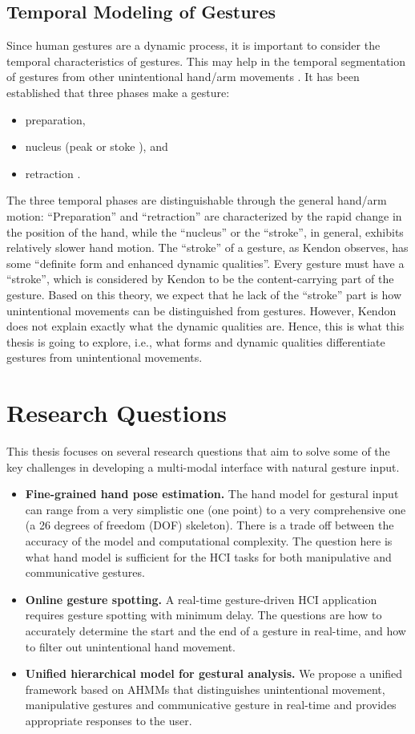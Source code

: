 \subsection{Temporal Modeling of Gestures}
Since human gestures are a dynamic process, it is important to consider the
temporal characteristics of gestures. This may help in the temporal segmentation
of gestures from other unintentional hand/arm movements \cite{Pavlovic97}. It
has been established that three phases make a gesture:
\begin{itemize}
  \item preparation,
  \item nucleus (peak or stoke \cite{mcneill82}), and
  \item retraction \cite{Pavlovic97}.
\end{itemize}
The three temporal phases are distinguishable through the general hand/arm
motion: ``Preparation'' and ``retraction'' are characterized by the rapid change
in the position of the hand, while the ``nucleus'' or the ``stroke'', in
general, exhibits relatively slower hand motion. The ``stroke'' of a gesture, as
Kendon \cite{kendon86} observes, has some ``definite form and enhanced dynamic
qualities''. Every gesture must have a ``stroke'', which is considered by Kendon
to be the content-carrying part of the gesture. Based on this theory, we
expect that he lack of the ``stroke'' part is how unintentional movements can
be distinguished from gestures. However, Kendon does not explain exactly what
the dynamic qualities are. Hence, this is what this thesis is going to explore, i.e., what forms and dynamic qualities differentiate gestures from unintentional movements.

\section{Research Questions}
This thesis focuses on several research questions that aim to solve some of the
key challenges in developing a multi-modal interface with natural gesture input.

\begin{itemize}
  \item \textbf{Fine-grained hand pose estimation.} The hand model for
  gestural input can range from a very simplistic one (one point) to a very
  comprehensive one (a 26 degrees of freedom (DOF) skeleton). There is a trade
  off between the accuracy of the model and computational complexity. The question
  here is what hand model is sufficient for the HCI tasks for both manipulative
  and communicative gestures.
  \item \textbf{Online gesture spotting.} A real-time gesture-driven HCI
  application requires gesture spotting with minimum delay. The questions are how to accurately determine the
  start and the end of a gesture in real-time, and how to filter out
  unintentional hand movement.
  \item \textbf{Unified hierarchical model for gestural analysis.} We propose a
  unified framework based on AHMMs that distinguishes unintentional movement,
  manipulative gestures and communicative gesture in real-time and provides
  appropriate responses to the user.
\end{itemize}

